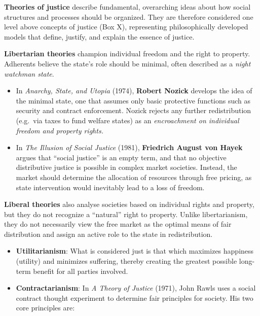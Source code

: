 \documentclass[
  a4paper,
  openany]{book}
\newcounter{quartocallouttipno}
\newcommand{\quartocallouttip}[1]{\refstepcounter{quartocallouttipno}\label{#1}}
\begin{document}
\begin{tcolorbox}[enhanced jigsaw, left=2mm, arc=.35mm, titlerule=0mm, opacityback=0, leftrule=.75mm, title={Note \ref*{tip-justice}: Theories of justice}, breakable, bottomtitle=1mm, rightrule=.15mm, coltitle=black, toptitle=1mm, bottomrule=.15mm, colback=white, opacitybacktitle=0.6, colbacktitle=quarto-callout-note-color!10!white, toprule=.15mm, colframe=quarto-callout-note-color-frame]

\quartocallouttip{tip-justice} 

\textbf{Theories of justice} describe fundamental, overarching ideas
about how social structures and processes should be organized. They are
therefore considered one level above concepts of justice (Box X),
representing philosophically developed models that define, justify, and
explain the essence of justice.

\textbf{Libertarian theories} champion individual freedom and the right
to property. Adherents believe the state's role should be minimal, often
described as a \emph{night watchman state}.

\begin{itemize}
\item
  In \emph{Anarchy, State, and Utopia} (1974), \textbf{Robert Nozick}
  develops the idea of the minimal state, one that assumes only basic
  protective functions such as security and contract enforcement. Nozick
  rejects any further redistribution (e.g.~via taxes to fund welfare
  states) as an \emph{encroachment on individual freedom and property
  rights.}
\item
  In \emph{The Illusion of Social Justice} (1981), \textbf{Friedrich
  August von Hayek} argues that ``social justice'' is an empty term, and
  that no objective distributive justice is possible in complex market
  societies. Instead, the market should determine the allocation of
  resources through free pricing, as state intervention would inevitably
  lead to a loss of freedom.
\end{itemize}

\textbf{Liberal theories} also analyse societies based on individual
rights and property, but they do not recognize a ``natural'' right to
property. Unlike libertarianism, they do not necessarily view the free
market as the optimal means of fair distribution and assign an active
role to the state in redistribution.

\begin{itemize}
\item
  \textbf{Utilitarianism}: What is considered just is that which
  maximizes happiness (utility) and minimizes suffering, thereby
  creating the greatest possible long-term benefit for all parties
  involved.
\item
  \textbf{Contractarianism}: In \emph{A Theory of Justice} (1971), John
  Rawls uses a social contract thought experiment to determine fair
  principles for society. His two core principles are:


\end{itemize}
\end{tcolorbox}
\end{document}
